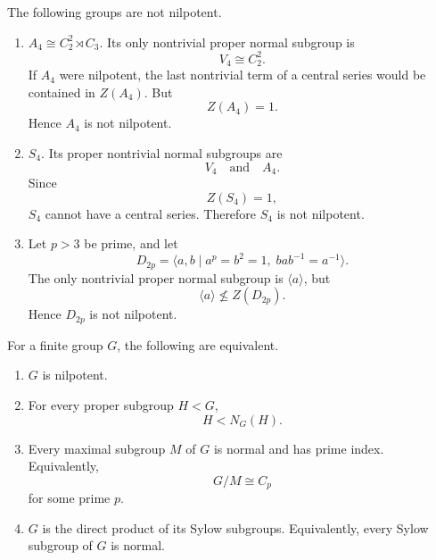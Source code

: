 \begin{example}
The following groups are not nilpotent.

\begin{enumerate}[label=(\arabic*)]
    \item \(A_4\cong C_2^2\rtimes C_3\). Its only nontrivial proper normal
    subgroup is
    \[
        V_4\cong C_2^2.
    \]
    If \(A_4\) were nilpotent, the last nontrivial term of a central series
    would be contained in \(Z(A_4)\). But
    \[
        Z(A_4)=1.
    \]
    Hence \(A_4\) is not nilpotent.

    \item \(S_4\). Its proper nontrivial normal subgroups are
    \[
        V_4\quad\text{and}\quad A_4.
    \]
    Since
    \[
        Z(S_4)=1,
    \]
    \(S_4\) cannot have a central series. Therefore \(S_4\) is not nilpotent.

    \item Let \(p>3\) be prime, and let
    \[
        D_{2p}=\langle a,b\mid a^p=b^2=1,\; bab^{-1}=a^{-1}\rangle.
    \]
    The only nontrivial proper normal subgroup is \(\langle a\rangle\), but
    \[
        \langle a\rangle\nleq Z(D_{2p}).
    \]
    Hence \(D_{2p}\) is not nilpotent.
\end{enumerate}
\end{example}

\begin{theorem}
For a finite group \(G\), the following are equivalent.

\begin{enumerate}[label=(\arabic*)]
    \item \(G\) is nilpotent.

    \item For every proper subgroup \(H<G\),
    \[
        H<N_G(H).
    \]

    \item Every maximal subgroup \(M\) of \(G\) is normal and has prime index.
    Equivalently,
    \[
        G/M\cong C_p
    \]
    for some prime \(p\).

    \item \(G\) is the direct product of its Sylow subgroups. Equivalently,
    every Sylow subgroup of \(G\) is normal.
\end{enumerate}
\end{theorem}

